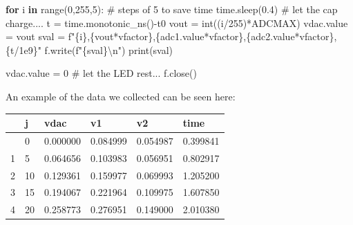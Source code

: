 \documentclass[
  letterpaper,
  DIV=11,
  numbers=noendperiod]{scrartcl}
\newenvironment{Shaded}{\begin{snugshade}}{\end{snugshade}}
\newcommand{\BuiltInTok}[1]{\textcolor[rgb]{0.00,0.23,0.31}{#1}}
\newcommand{\CharTok}[1]{\textcolor[rgb]{0.13,0.47,0.30}{#1}}
\newcommand{\CommentTok}[1]{\textcolor[rgb]{0.37,0.37,0.37}{#1}}
\newcommand{\ControlFlowTok}[1]{\textcolor[rgb]{0.00,0.23,0.31}{\textbf{#1}}}
\newcommand{\DecValTok}[1]{\textcolor[rgb]{0.68,0.00,0.00}{#1}}
\newcommand{\FloatTok}[1]{\textcolor[rgb]{0.68,0.00,0.00}{#1}}
\newcommand{\KeywordTok}[1]{\textcolor[rgb]{0.00,0.23,0.31}{\textbf{#1}}}
\newcommand{\NormalTok}[1]{\textcolor[rgb]{0.00,0.23,0.31}{#1}}
\newcommand{\OperatorTok}[1]{\textcolor[rgb]{0.37,0.37,0.37}{#1}}
\newcommand{\SpecialCharTok}[1]{\textcolor[rgb]{0.37,0.37,0.37}{#1}}
\newcommand{\SpecialStringTok}[1]{\textcolor[rgb]{0.13,0.47,0.30}{#1}}
\begin{document}
\begin{Shaded}
\begin{Highlighting}[]
\ControlFlowTok{for}\NormalTok{ i }\KeywordTok{in} \BuiltInTok{range}\NormalTok{(}\DecValTok{0}\NormalTok{,}\DecValTok{255}\NormalTok{,}\DecValTok{5}\NormalTok{): }\CommentTok{\# steps of 5 to save time}
\NormalTok{    time.sleep(}\FloatTok{0.4}\NormalTok{) }\CommentTok{\# let the cap charge....}
\NormalTok{    t }\OperatorTok{=}\NormalTok{ time.monotonic\_ns()}\OperatorTok{{-}}\NormalTok{t0}
\NormalTok{    vout }\OperatorTok{=} \BuiltInTok{int}\NormalTok{((i}\OperatorTok{/}\DecValTok{255}\NormalTok{)}\OperatorTok{*}\NormalTok{ADCMAX)}
\NormalTok{    vdac.value }\OperatorTok{=}\NormalTok{ vout}
\NormalTok{    sval }\OperatorTok{=} \SpecialStringTok{f"}\SpecialCharTok{\{}\NormalTok{i}\SpecialCharTok{\}}\SpecialStringTok{,}\SpecialCharTok{\{}\NormalTok{vout}\OperatorTok{*}\NormalTok{vfactor}\SpecialCharTok{\}}\SpecialStringTok{,}\SpecialCharTok{\{}\NormalTok{adc1}\SpecialCharTok{.}\NormalTok{value}\OperatorTok{*}\NormalTok{vfactor}\SpecialCharTok{\}}\SpecialStringTok{,}\SpecialCharTok{\{}\NormalTok{adc2}\SpecialCharTok{.}\NormalTok{value}\OperatorTok{*}\NormalTok{vfactor}\SpecialCharTok{\}}\SpecialStringTok{,}\SpecialCharTok{\{}\NormalTok{t}\OperatorTok{/}\FloatTok{1e9}\SpecialCharTok{\}}\SpecialStringTok{"}
\NormalTok{    f.write(}\SpecialStringTok{f"}\SpecialCharTok{\{}\NormalTok{sval}\SpecialCharTok{\}}\CharTok{\textbackslash{}n}\SpecialStringTok{"}\NormalTok{)}
    \BuiltInTok{print}\NormalTok{(sval)}

\NormalTok{vdac.value }\OperatorTok{=} \DecValTok{0} \CommentTok{\# let the LED rest...}
\NormalTok{f.close()}
\end{Highlighting}
\end{Shaded}

An example of the data we collected can be seen here:

\begin{longtable}[]{@{}llllll@{}}
\toprule\noalign{}
& j & vdac & v1 & v2 & time \\
\midrule\noalign{}
\endhead
\bottomrule\noalign{}
\endlastfoot
0 & 0 & 0.000000 & 0.084999 & 0.054987 & 0.399841 \\
1 & 5 & 0.064656 & 0.103983 & 0.056951 & 0.802917 \\
2 & 10 & 0.129361 & 0.159977 & 0.069993 & 1.205200 \\
3 & 15 & 0.194067 & 0.221964 & 0.109975 & 1.607850 \\
4 & 20 & 0.258773 & 0.276951 & 0.149000 & 2.010380 \\
\end{longtable}
\end{document}
